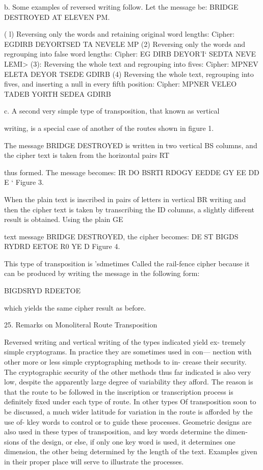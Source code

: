 b. Some examples of reversed writing follow. Let the message be:
BRIDGE DESTROYED AT ELEVEN PM.

( l) Reversing only the words and retaining original word lengths:
Cipher: EGDIRB DEYORTSED TA NEVELE MP
(2) Reversing only the words and regrouping into false word
lengths:
Cipher: EG DIRB DEYOR'I‘ SEDTA NEVE LEMI>
(3): Reversing the whole text and regrouping into ﬁves:
Cipher: MPNEV ELETA DEYOR TSEDE GDIRB
(4) Reversing the whole text, regrouping into ﬁves, and inserting
a null in every ﬁfth position:
Cipher: MPNER VELEO TADEB YORTH SEDEA GDIRB

c. A second very simple type of transposition, that known as vertical

writing, is a special case of another of the routes shown in ﬁgure 1.

The message BRIDGE DESTROYED is written in two vertical BS
columns, and the cipher text is taken from the horizontal pairs RT

thus formed. The message becomes: IR
DO
BSRTI RDOGY EEDDE GY
EE
DD
E
‘ Figure 3.

When the plain text is inscribed in pairs of letters in vertical BR
writing and then the cipher text is taken by transcribing the ID
columns, a slightly different result is obtained. Using the plain GE

text message BRIDGE DESTROYED, the cipher becomes: DE
ST
BIGDS RYDRD EETOE R0
YE
D
Figure 4.

This type of transposition is 'sdmetimes Called the rail-fence cipher
because it can be produced by writing the message in the following form:

BIGDSRYD
RDEETOE

which yields the same cipher result as before.

25. Remarks on Monoliteral Route Transposition

Reversed writing and vertical writing of the types indicated yield ex-
tremely simple cryptograms. In practice they are sometimes used in con—
nection with other more or less simple cryptographing methods to in-
crease their security. The cryptographic security of the other methods
thus far indicated is also very low, despite the apparently large degree of
variability they afford. The reason is that the route to be followed in the
inscription or transcription process is deﬁnitely ﬁxed under each type of
route. In other types Of transposition soon to be discussed, a much
wider latitude for variation in the route is afforded by the use of- kley
words to control or to guide these processes. Geometric designs are also
used in these types of transposition, and key words determine the dimen-
sions of the design, or else, if only one key word is used, it determines
one dimension, the other being determined by the length of the text.
Examples given in their proper place will serve to illustrate the processes.

